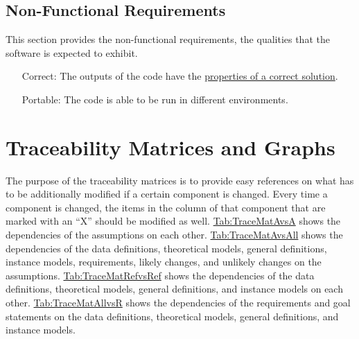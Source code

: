\documentclass[12pt]{article}
\begin{document}
\subsection{Non-Functional Requirements}
\label{Sec:NFRs}
This section provides the non-functional requirements, the qualities that the software is expected to exhibit.

\begin{itemize}
\item[Correct:\phantomsection\label{correct}]{The outputs of the code have the \hyperref[Sec:CorSolProps]{properties of a correct solution}.}
\item[Portable:\phantomsection\label{portable}]{The code is able to be run in different environments.}
\end{itemize}
\section{Traceability Matrices and Graphs}
\label{Sec:TraceMatrices}
The purpose of the traceability matrices is to provide easy references on what has to be additionally modified if a certain component is changed. Every time a component is changed, the items in the column of that component that are marked with an ``X'' should be modified as well. \hyperref[Table:TraceMatAvsA]{Tab:TraceMatAvsA} shows the dependencies of the assumptions on each other. \hyperref[Table:TraceMatAvsAll]{Tab:TraceMatAvsAll} shows the dependencies of the data definitions, theoretical models, general definitions, instance models, requirements, likely changes, and unlikely changes on the assumptions. \hyperref[Table:TraceMatRefvsRef]{Tab:TraceMatRefvsRef} shows the dependencies of the data definitions, theoretical models, general definitions, and instance models on each other. \hyperref[Table:TraceMatAllvsR]{Tab:TraceMatAllvsR} shows the dependencies of the requirements and goal statements on the data definitions, theoretical models, general definitions, and instance models.
\end{document}
